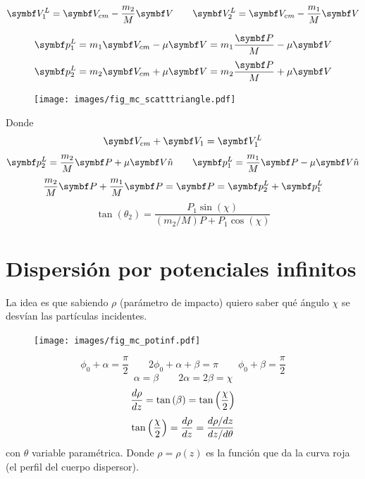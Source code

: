 \documentclass[10pt,oneside]{CBFT_book}
\begin{document}
\[
	\vb{V}_1^L = \vb{V}_{cm} - \frac{m_2}{M} \vb{V}	\qquad \vb{V}_2^L = \vb{V}_{cm} - \frac{m_1}{M} \vb{V}
\]

\[
	\vb{p}_1^L = m_1 \vb{V}_{cm} - \mu \vb{V} = m_1 \frac{\vb{P}}{M} - \mu \vb{V}
\]
\[
	\vb{p}_2^L = m_2 \vb{V}_{cm} + \mu \vb{V} = m_2 \frac{\vb{P}}{M} + \mu \vb{V}
\]
\begin{figure}[htb]
	\begin{center}
	\texttt{[image: images/fig\_mc\_scatttriangle.pdf]}	 
	\end{center}
	\caption{}
\end{figure} 
Donde 
\[
	\vb{V}_{cm} + \vb{V}_1 = \vb{V}_1^L
\]
\[
	\vb{p}_2^L = \frac{m_2}{M} \vb{P} + \mu \vb{V}\hat{n}		\qquad	 \vb{p}_1^L = \frac{m_1}{M} \vb{P} - \mu \vb{V}\hat{n}
\]
\[
	\frac{m_2}{M} \vb{P} + \frac{m_1}{M} \vb{P} = \vb{P} = \vb{p}_2^L + \vb{p}_1^L
\]
\[
	\tan(\theta_2) = \frac{P_1 \sin(\chi)}{ (m_2/M) P + P_1\cos(\chi)}
\]

\section{Dispersión por potenciales infinitos}

La idea es que sabiendo $\rho$ (parámetro de impacto) quiero saber qué ángulo $\chi$ se desvían las
partículas incidentes.
\begin{figure}[htb]
	\begin{center}
	\texttt{[image: images/fig\_mc\_potinf.pdf]}	 
	\end{center}
	\caption{}
\end{figure} 
\[
	\phi_0 + \alpha = \frac{\pi}{2}		\qquad		2 \phi_0 + \alpha + \beta = \pi
	\qquad \phi_0 + \beta = \frac{\pi}{2}
\]
\[
	\alpha = \beta		\qquad 		2\alpha = 2\beta = \chi
\]
\[
	\frac{d^{\hspace{-0.05em}} {\rho}}{d {z}^{\hspace{-0.05em}}} = \tan \left(\beta \right) = \tan\left(\frac{\chi}{2}\right)
\]
\[
	\tan\left(\frac{\chi}{2}\right) = \frac{d^{\hspace{-0.05em}} {\rho}}{d {z}^{\hspace{-0.05em}}} = \frac{ d\rho/dz }{ dz/d\theta }
\]
con $\theta$ variable paramétrica. Donde $\rho = \rho(z)$ es la función que da la curva roja (el perfil
del cuerpo dispersor).





\end{document}
